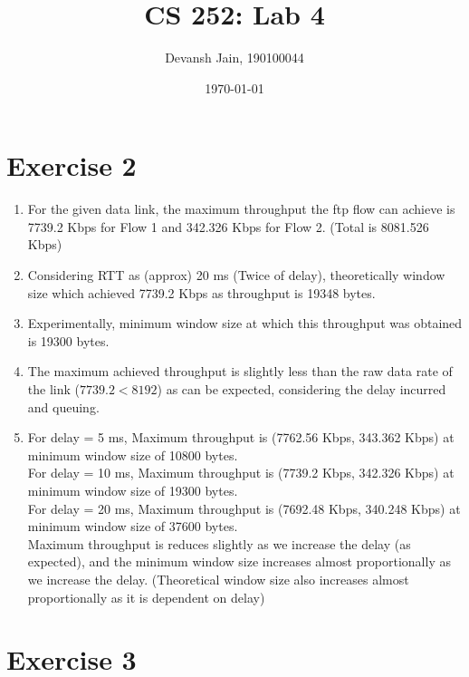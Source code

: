 \documentclass[12pt, fleqn]{article}
\title{\vspace{-4em}CS 252: Lab 4}
\author{Devansh Jain, 190100044}
\date{\today}
\begin{document}
\maketitle
\tableofcontents
\thispagestyle{empty}
\setcounter{page}{0}


\newpage 
\section*{Exercise 2}
\setcounter{equation}{0}

\begin{enumerate}
    \item For the given data link, the maximum throughput the ftp flow can achieve is 7739.2 Kbps for Flow 1 and 342.326 Kbps for Flow 2. (Total is 8081.526 Kbps)
    \item Considering RTT as (approx) 20 ms (Twice of delay), theoretically window size which achieved 7739.2 Kbps as throughput is 19348 bytes.
    \item Experimentally, minimum window size at which this throughput was obtained is 19300 bytes.
    \item The maximum achieved throughput is slightly less than the raw data rate of the link ($7739.2 < 8192$) as can be expected, considering the delay incurred and queuing.
    \item For delay = 5 ms, Maximum throughput is (7762.56 Kbps, 343.362 Kbps) at minimum window size of 10800 bytes. \\
    For delay = 10 ms, Maximum throughput is (7739.2 Kbps, 342.326 Kbps) at minimum window size of 19300 bytes. \\
    For delay = 20 ms, Maximum throughput is (7692.48 Kbps, 340.248 Kbps) at minimum window size of 37600 bytes. \\
    Maximum throughput is reduces slightly as we increase the delay (as expected), and the minimum window size increases almost proportionally as we increase the delay. (Theoretical window size also increases almost proportionally as it is dependent on delay) \\
\end{enumerate}


\newpage 
\section*{Exercise 3}
\setcounter{equation}{0}
\end{document}
